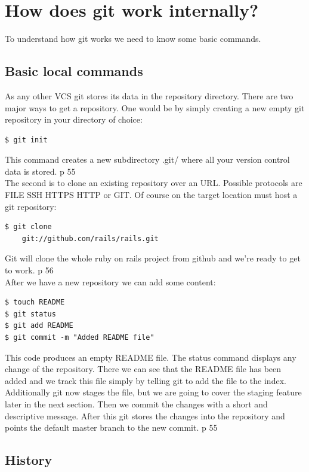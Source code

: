\section{How does git work internally?}

To understand how git works we need to know some basic commands.

\subsection {Basic local commands}

As any other VCS git stores its data in the repository directory.
There are two major ways to get a repository.
One would be by simply creating a new empty git repository in your directory of choice:
\begin{lstlisting}
$ git init
\end{lstlisting}
This command creates a new subdirectory .git/ where all your version control
data is stored. \cite{gitinternals2008} p 55 \\
The second is to clone an existing repository over an URL. Possible protocols
are FILE SSH HTTPS HTTP or GIT. Of course on the target location must host a
git repository:
\begin{lstlisting}
$ git clone 
    git://github.com/rails/rails.git
\end{lstlisting}
Git will clone the whole ruby on rails project from github and we're
ready to get to work. \cite{gitinternals2008} p 56 \\

After we have a new repository we can add some content:
\begin{lstlisting}
$ touch README
$ git status
$ git add README
$ git commit -m "Added README file"
\end{lstlisting}

This code produces an empty README file. The status command displays any change
of the repository. There we can see that the README file has been added and we
track this file simply by telling git to add the file to the index. Additionally
git now stages the file, but we are going to cover the staging feature later in the next
section. Then we commit the changes with a short and descriptive message. After
this git stores the changes into the repository and points the default master
branch to the new commit. \cite{gitinternals2008} p 55 \\

\subsection {History}

